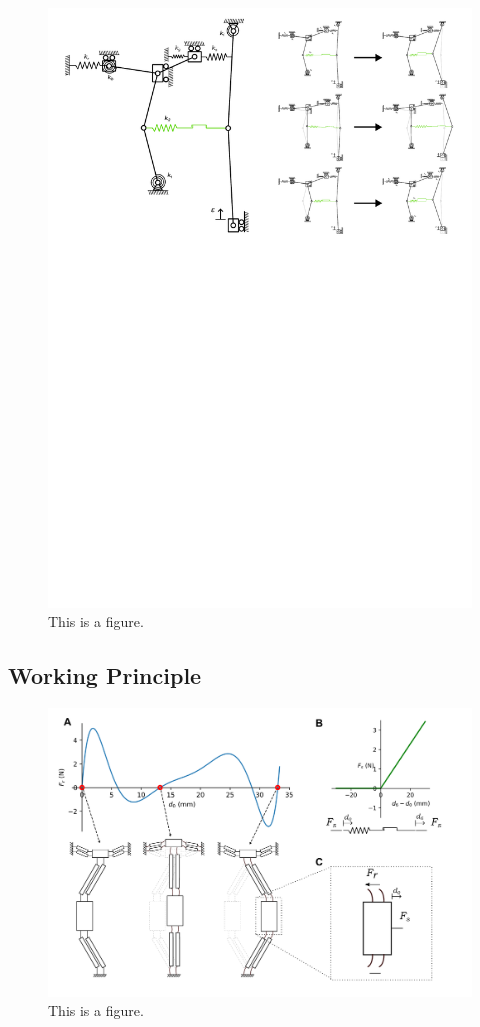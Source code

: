 \begin{figure}[h]
    \centering
    \includegraphics[width=\textwidth]{images/SVGs/Bifurcation_and_PRBM.pdf}
    \caption{This is a figure.}
    \label{fig:Bifurcation}
\end{figure}

\subsection*{Working Principle}
\begin{figure}[h]
    \centering
    \includegraphics[width=\textwidth]{images/SVGs/Equilibria1.pdf}
    \caption{This is a figure.}
    \label{fig:Equilibria and Tension-only spring}
\end{figure}

